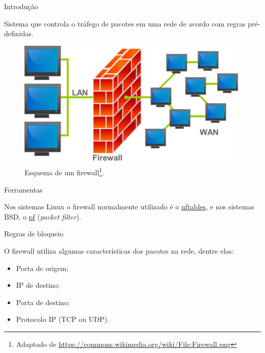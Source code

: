 
\begin{frame}{Introdução}
  
Sistema que controla o tráfego de pacotes em uma rede de acordo com
regras pré-definidas.

\begin{figure}[ht]
\centering
\includegraphics[scale=.7]{firewall.png}
\caption{Esquema de um firewall\footnote{\scriptsize Adaptado de
    \url{https://commons.wikimedia.org/wiki/File:Firewall.png}}.}
\end{figure}

\end{frame}

\begin{frame}{Ferramentas}

  Nos sistemas Linux o firewall normalmente utilizado é o
  \href{http://www.netfilter.org/projects/nftables/}{nftables}, e nos
  sistemas BSD, o \href{http://www.openbsd.org/faq/pf/}{pf} ({\em packet
    filter}).

\end{frame}

\begin{frame}{Regras de bloqueio}

  O firewall utiliza algumas características dos pacotes na rede,
  dentre elas:

\begin{itemize}
\item Porta de origem;
\item IP de destino;
\item Porta de destino;
\item Protocolo IP (TCP ou UDP).
\end{itemize}
\end{frame}

